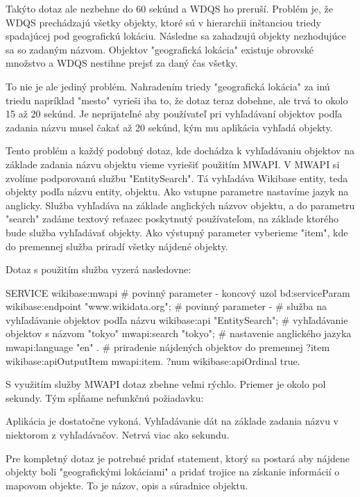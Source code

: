 Takýto dotaz ale nezbehne do 60 sekúnd a WDQS ho preruší. Problém je, že WDQS prechádzajú všetky objekty, ktoré
sú v hierarchii inštanciou triedy spadajúcej pod geografickú lokáciu. Následne sa zahadzujú objekty nezhodujúce sa so zadaným názvom.
Objektov "geografická lokácia" existuje obrovské množstvo a WDQS nestihne prejsť za daný čas všetky.

To nie je ale jediný problém. Nahradením triedy "geografická lokácia" za inú triedu napríklad "mesto" vyrieši iba to, že dotaz teraz dobehne, ale
trvá to okolo 15 až 20 sekúnd. Je neprijateľné aby používateľ pri vyhľadávaní objektov podľa zadania názvu musel čakať až 20 sekúnd, kým mu aplikácia vyhľadá objekty.

Tento problém a každý podobný dotaz, kde dochádza k vyhľadávaniu objektov na základe zadania názvu objektu vieme vyriešiť použitím MWAPI.
V MWAPI si zvolíme podporovanú službu "EntitySearch". Tá vyhľadáva Wikibase entity, teda objekty podľa názvu entity, objektu.
Ako vstupne parametre nastavíme jazyk na anglicky. Služba vyhľadáva na základe anglických názvov objektu, a do parametru "search" zadáme textový reťazec poskytnutý používateľom, na základe ktorého bude služba vyhľadávať
objekty. Ako výstupný parameter vyberieme "item", kde do premennej služba priradí všetky nájdené objekty.

Dotaz s použitím služba vyzerá nasledovne:
\begin{code}
      SERVICE wikibase:mwapi {
      # povinný parameter - koncový uzol
      bd:serviceParam wikibase:endpoint "www.wikidata.org";
      # povinný parameter -
      # služba na vyhľadávanie objektov podľa názvu
      wikibase:api "EntitySearch";
      # vyhľadávanie objektov s názvom "tokyo"
      mwapi:search "tokyo";
      # nastavenie anglického jazyka
      mwapi:language "en" .
      # priradenie nájdených objektov do premennej
      ?item wikibase:apiOutputItem mwapi:item.
      ?num wikibase:apiOrdinal true. }
\end{code}

S využitím služby MWAPI dotaz zbehne veľmi rýchlo. Priemer je okolo pol sekundy.
Tým spĺňame nefunkčnú požiadavku:

Aplikácia je dostatočne vykoná. Vyhľadávanie dát na základe zadania názvu v niektorom z vyhľadávačov. Netrvá viac ako sekundu.

Pre kompletný dotaz je potrebné pridať statement, ktorý sa postará aby nájdene objekty boli "geografickými lokáciami" a
pridať trojice na získanie informácií o mapovom objekte. To je názov, opis a súradnice objektu.

